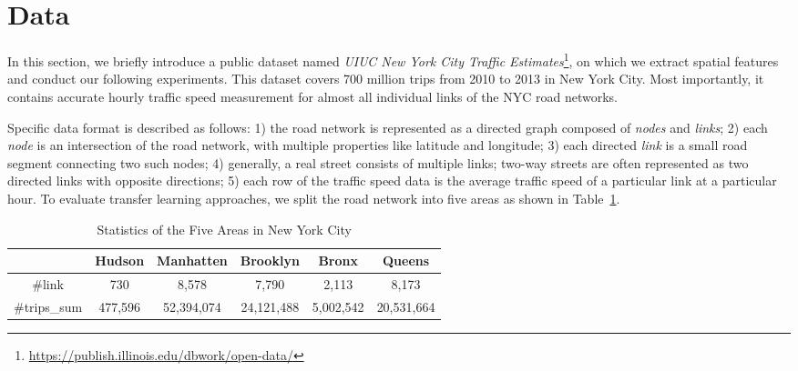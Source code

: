 \section{Data}
In this section, we briefly introduce a public dataset named \textit{UIUC New York City Traffic Estimates}\footnote{\url{https://publish.illinois.edu/dbwork/open-data/}}, on which we extract spatial features and conduct our following experiments.
This dataset covers 700 million trips from 2010 to 2013 in New York City. 
Most importantly, it contains accurate hourly traffic speed measurement for almost all individual links of the NYC road networks.  

Specific data format is described as follows:
1) the road network is represented as a directed graph composed of \textit{nodes} and \textit{links}; 
2) each \textit{node} is an intersection of the road network, with multiple properties like latitude and longitude;  
3) each directed \textit{link} is a small road segment connecting two such nodes;   
4) generally, a real street consists of multiple links;
two-way streets are often represented as two directed links with opposite directions; 
5) each row of the traffic speed data is the average traffic speed of a particular link at a particular hour.
To evaluate transfer learning approaches, we split the road network into five areas as shown in Table~\ref{tab:regions}.

\begin{table}[th!]
	\centering
	\small
	\caption{Statistics of the Five Areas in New York City}
	\label{tab:regions}
	\begin{tabular}{|c|c|c|c|c|c|}
		\cline{1-6}
		~& \textbf{Hudson}  & \textbf{Manhatten}  & \textbf{Brooklyn}  & \textbf{Bronx}    & \textbf{Queens}    \\ \hline
		\#link           & 730     & 8,578       & 7,790      & 2,113     & 8,173      \\ 
		\#trips\_sum & 477,596  & 52,394,074   & 24,121,488  & 5,002,542  & 20,531,664  \\ \hline
	\end{tabular}
\end{table}


